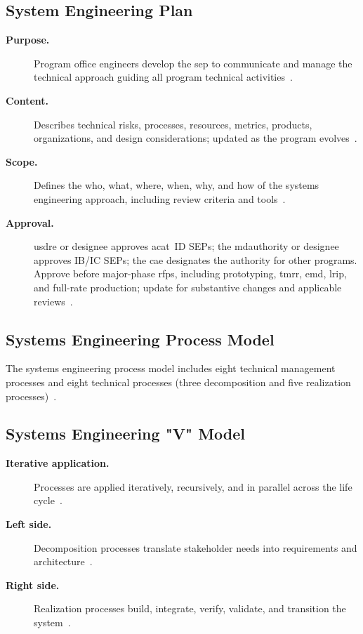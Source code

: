 \documentclass[../main.tex]{subfiles}
\begin{document}
\subsection{System Engineering Plan}
\begin{description}
  \item[\textbf{Purpose.}] Program office engineers develop the \ac{sep} to communicate and manage the technical approach guiding all program technical activities~\autocite{edo-3-5-1-systems-engineering-overview-2025}.
  \item[\textbf{Content.}] Describes technical risks, processes, resources, metrics, products, organizations, and design considerations; updated as the program evolves~\autocite{edo-3-5-1-systems-engineering-overview-2025}.
  \item[\textbf{Scope.}] Defines the who, what, where, when, why, and how of the systems engineering approach, including review criteria and tools~\autocite{edo-3-5-1-systems-engineering-overview-2025}.
  \item[\textbf{Approval.}] \ac{usdre} or designee approves \ac{acat}~ID SEPs; the \ac{mdauthority} or designee approves IB/IC SEPs; the \ac{cae} designates the authority for other programs. Approve before major-phase \acp{rfp}, including prototyping, \ac{tmrr}, \ac{emd}, \ac{lrip}, and full-rate production; update for substantive changes and applicable reviews~\autocite{DoDI5000-88}.
\end{description}

\subsection{Systems Engineering Process Model}
The systems engineering process model includes eight technical management processes and eight technical processes (three decomposition and five realization processes)~\autocite{edo-3-5-1-systems-engineering-overview-2025}.

\subsection{Systems Engineering "V" Model}
\begin{description}
  \item[\textbf{Iterative application.}] Processes are applied iteratively, recursively, and in parallel across the life cycle~\autocite{edo-3-5-1-systems-engineering-overview-2025}.
  \item[\textbf{Left side.}] Decomposition processes translate stakeholder needs into requirements and architecture~\autocite{edo-3-5-1-systems-engineering-overview-2025}.
  \item[\textbf{Right side.}] Realization processes build, integrate, verify, validate, and transition the system~\autocite{edo-3-5-1-systems-engineering-overview-2025}.
\end{description}
\end{document}
